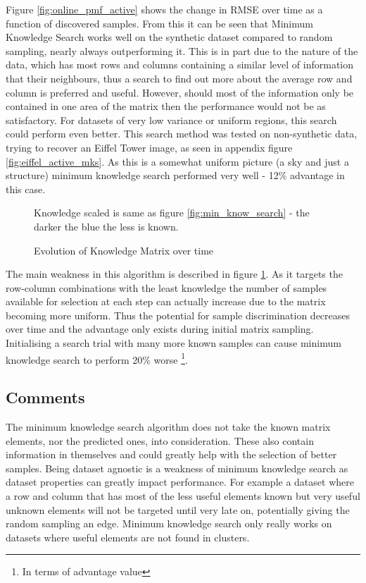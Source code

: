 Figure \ref{fig:online_pmf_active} shows the change in RMSE over time as a function of discovered samples. From this it can be seen that Minimum Knowledge Search works well on the synthetic dataset compared to random sampling, nearly always outperforming it. This is in part due to the nature of the data, which has most rows and columns containing a similar level of information that their neighbours, thus a search to find out more about the average row and column is preferred and useful. However, should most of the information only be contained in one area of the matrix then the performance would not be as satisfactory. For datasets of very low variance or uniform regions, this search could perform even better. This search method was tested on non-synthetic data, trying to recover an Eiffel Tower image, as seen in appendix figure \ref{fig:eiffel_active_mks}. As this is a somewhat uniform picture (a sky and just a structure) minimum knowledge search performed very well - 12\% advantage in this case.
\begin{figure}%
    \centering
    \qquad
    \qquad
    
    Knowledge scaled is same as figure \ref{fig:min_know_search} - the darker the blue the less is known.
    \caption{Evolution of Knowledge Matrix over time}%
    \label{fig:know_mat_it}
\end{figure}

The main weakness in this algorithm is described in figure \ref{fig:know_mat_it}. As it targets the row-column combinations with the least knowledge the number of samples available for selection at each step can actually increase due to the matrix becoming more uniform. Thus the potential for sample discrimination decreases over time and the advantage only exists during initial matrix sampling. Initialising a search trial with many more known samples can cause minimum knowledge search to perform 20\% worse \footnote{In terms of advantage value}.

\subsection{Comments}
The minimum knowledge search algorithm does not take the known matrix elements, nor the predicted ones, into consideration. These also contain information in themselves and could greatly help with the selection of better samples. Being dataset agnostic is a weakness of minimum knowledge search as dataset properties can greatly impact performance. For example a dataset where a row and column that has most of the less useful elements known but very useful unknown elements will not be targeted until very late on, potentially giving the random sampling an edge. Minimum knowledge search only really works on datasets where useful elements are not found in clusters.

